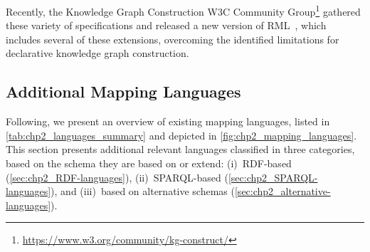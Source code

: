 Recently, the Knowledge Graph Construction W3C Community Group\footnote{\url{https://www.w3.org/community/kg-construct/}} gathered these variety of specifications and released a new version of RML~\parencite{iglesias2023rml}, which includes several of these extensions, overcoming the identified limitations for declarative knowledge graph construction.




\subsection{Additional Mapping Languages}
\label{sec:chp2_more-languages}

Following, we present an overview of existing mapping languages, listed in \cref{tab:chp2_languages_summary} and depicted in  \cref{fig:chp2_mapping_languages}. This section presents additional relevant languages classified in three categories, based on the schema they are based on or extend: (i)~RDF-based (\cref{sec:chp2_RDF-languages}), (ii)~SPARQL-based (\cref{sec:chp2_SPARQL-languages}), and (iii)~based on alternative schemas (\cref{sec:chp2_alternative-languages}).


